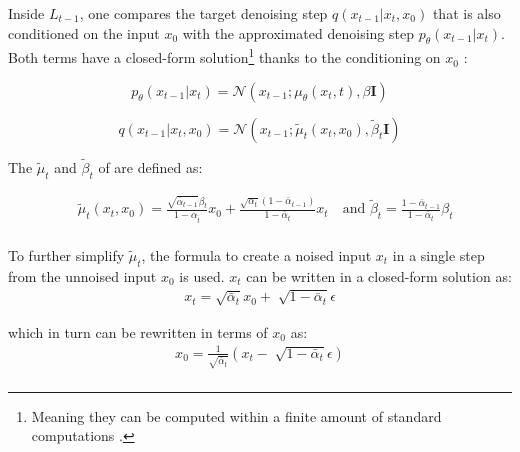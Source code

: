 Inside $L_{t-1}$, one compares the target denoising step $q(x_{t-1}|x_t,x_0)$ that is also conditioned on the input $x_0$ with the approximated denoising step $p_\theta(x_{t-1}|x_t)$. %
Both terms have a closed-form solution\footnote{Meaning they can be computed within a finite amount of standard computations \cite{borwein2013ClosedFormsWhat}.} thanks to the conditioning on $x_0$ \cite{ho2020DenoisingDiffusionProbabilistic}:

\begin{equation}
  \label{eqn:lt-1_1}
  p_\theta(x_{t-1}|x_t)= \mathcal{N}(x_{t-1};\mu_\theta(x_t,t), \beta\textbf{I})
\end{equation}

\begin{equation}
  \label{eqn:lt-1_2}
q(x_{t-1}|x_t,x_0) = \mathcal{N}(x_{t-1};\tilde{\mu}_t(x_t,x_0), \tilde{\beta}_t\textbf{I})
\end{equation}

\noindent The $\tilde{\mu}_t$ and $\tilde{\beta}_t$ of  are defined as:

\begin{equation}
  \begin{align}
    \label{eqn:lt-1_21}
    &\tilde{\mu}_t(x_t, x_0) = \frac{\sqrt{\bar{\alpha}_{t-1}}\beta_t}{1 - \alpha_{\bar{t}}}x_0 +   \frac{\sqrt{\alpha_t}(1-\bar{\alpha}_{t-1})}{1 - \bar{\alpha}_{t}}x_t \quad \textrm{and }
    \tilde{\beta}_t =\frac{1-\bar{\alpha}_{t-1}}{1-\bar{\alpha}_t}\beta_t \\
  \end{align}
\end{equation}

\noindent To further simplify $\tilde{\mu}_t$, the formula to create a noised input $x_t$ in a single step from the unnoised input $x_0$ is used.
$x_t$ can be written in a closed-form solution as:
\begin{equation}
  \begin{align}
    \label{eqn:lt-1_22}
    x_t = \sqrt{\bar{\alpha}_{t}}x_0+\sqrt[]{1-\bar{\alpha}_t}\epsilon
  \end{align}
\end{equation}

\noindent which in turn can be rewritten in terms of $x_0$ as:
\begin{equation}
  \begin{align}
    \label{eqn:lt-1_23}
    x_0 = \frac{1}{\sqrt{\bar{\alpha}_t}}(x_t-\sqrt[]{1-\bar{\alpha}_t}\epsilon) \\
  \end{align}
\end{equation}

